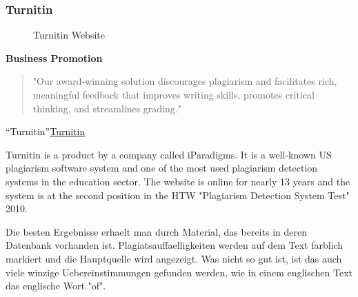 \subsubsection{Turnitin} 
 \begin{figure}[!h]
  \centering
  \caption{Turnitin Website}
  \label{fig:Turnitin Website}
\end{figure}

\textbf{Business Promotion}
\begin{quote}
"Our award-winning solution discourages plagiarism and facilitates rich, meaningful feedback that improves writing skills, promotes critical thinking, and streamlines grading."
\end{quote}
\enquote{Turnitin}\citep{Turnitin Business Promotion}\href{http://www.turnitin.com}{Turnitin}


Turnitin is a product by a company called iParadigms. It is a well-known US plagiarism software system and one of the most used plagiarism detection systems in the education sector. The website is online for nearly 13 years and the system is at the second position in the HTW "Plagiarism Detection System Test" 2010.  

Die besten Ergebnisse erhaelt man durch Material, das bereits in deren Datenbank vorhanden ist. Plagiatsauffaelligkeiten werden auf dem Text farblich markiert und die Hauptquelle wird angezeigt.
Was nicht so gut ist, ist das auch viele winzige Uebereinstimmungen gefunden werden, wie in einem englischen Text das englische Wort "of".


